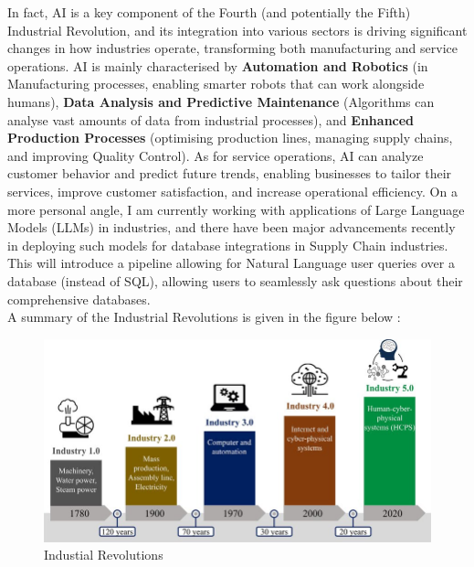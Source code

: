 \documentclass[12pt]{article}
\begin{document}
In fact, AI is a key component of the Fourth (and potentially the Fifth) Industrial Revolution, and its integration into various sectors is driving significant changes in how industries operate, transforming both manufacturing and service operations. AI is mainly characterised by \textbf{Automation and Robotics} (in Manufacturing processes, enabling smarter robots that can work alongside humans), \textbf{Data Analysis and Predictive Maintenance} (Algorithms can analyse vast amounts of data from industrial processes), and \textbf{Enhanced Production Processes} (optimising production lines, managing supply chains, and improving Quality Control). As for service operations, AI can analyze customer behavior and predict future trends, enabling businesses to tailor their services, improve customer satisfaction, and increase operational efficiency. On a more personal angle, I am currently working with applications of Large Language Models (LLMs) in industries, and there have been major advancements recently in deploying such models for database integrations in Supply Chain industries. This will introduce a pipeline allowing for Natural Language user queries over a database (instead of SQL), allowing users to seamlessly ask questions about their comprehensive databases. \\ 

\noindent A summary of the Industrial Revolutions is given in the figure below \cite{article}: 

\begin{figure}[H]
    \centering
    \includegraphics[width=\textwidth]{Images/Industrial-revolutions-in-human-history-The-first-industrial-revolution-used-water-and.jpg}
    \caption{Industial Revolutions}
    \label{fig:3-industrialrevolutions}
\end{figure} 

\newpage
\end{document}
